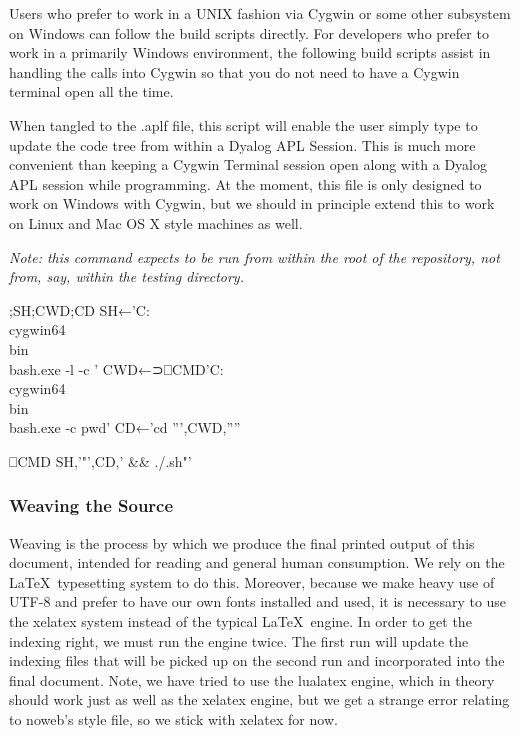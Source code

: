 \documentclass{article}%
\begin{document}
Users who prefer to work in a UNIX fashion via Cygwin or some other
subsystem on Windows can follow the build scripts directly.
For developers who prefer to work in a primarily Windows environment,
the following build scripts assist in handling the calls into Cygwin
so that you do not need to have a Cygwin terminal open all the time.

When tangled to the {\Tt{}.aplf\nwendquote} file, this script will enable the
user simply type {\Tt{}\nwendquote} to update the code tree from within a
Dyalog APL Session.
This is much more convenient than keeping a Cygwin Terminal
session open along with a Dyalog APL session while programming.
At the moment, this file is only designed to work on Windows with
Cygwin, but we should in principle extend this to work on Linux
and Mac OS X style machines as well.

\emph{Note: this command expects to be run from within the root of
the repository, not from, say, within the {\Tt{}testing\nwendquote} directory.}

\nwenddocs{}\endmoddef\nwstartdeflinemarkup\nwenddeflinemarkup
{};SH;CWD;CD
SH←'C:\\cygwin64\\bin\\bash.exe -l -c '
CWD←⊃⎕CMD'C:\\cygwin64\\bin\\bash.exe -c pwd'
CD←'cd ''',CWD,''''

⎕CMD SH,'"',CD,' && ./.sh"'
\eatline
{}\nwendcode{}\nwdocspar
\subsubsection{Weaving the Source}

Weaving is the process by which we produce the final printed output
of this document,
intended for reading and general human consumption.
We rely on the \LaTeX\ typesetting system to do this.
Moreover, because we make heavy use of UTF-8 and prefer to have our
own fonts installed and used,
it is necessary to use the {\Tt{}xelatex\nwendquote} system instead of the typical
\LaTeX\ engine.
In order to get the indexing right, we must run the engine twice.
The first run will update the indexing files that will be picked
up on the second run and incorporated into the final document.
Note, we have tried to use the {\Tt{}lualatex\nwendquote} engine, which in theory
should work just as well as the {\Tt{}xelatex\nwendquote} engine, but we get a
strange error relating to noweb's style file, so we stick with
{\Tt{}xelatex\nwendquote} for now.
\end{document}
